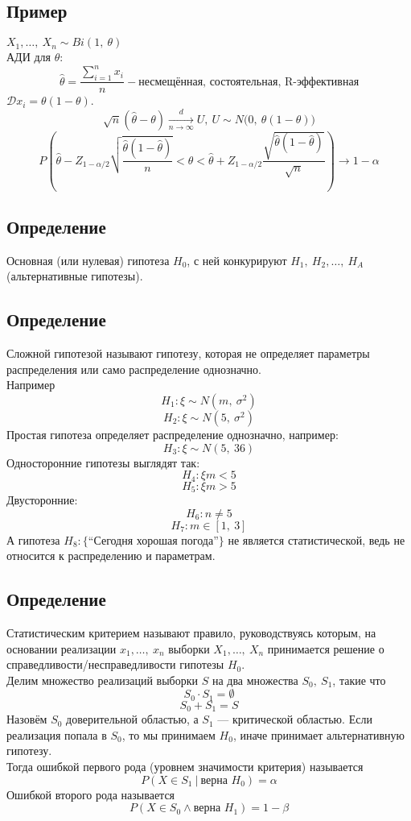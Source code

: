 \documentclass[12pt, a4paper]{article}
\newcommand{\dev}{\mathcal{D}}
\begin{document}
\subsection*{Пример}
$X_1,\dots,\ X_n \sim Bi(1,\ \theta)$\\
АДИ для $\theta$:
\[\hat\theta = \frac{\sum_{i = 1}^{n} x_i}{n} - \text{несмещённая, состоятельная, R-эффективная}\]
$\dev x_i = \theta(1 - \theta)$.
\[\sqrt{n} (\hat \theta - \theta) \xrightarrow[n\to \infty]{d} U,\ U\sim N\big(0,\ \theta(1 - \theta)\big)\]
\[P\left( \hat\theta - Z_{1 - \alpha/2} \sqrt{\frac{\hat\theta(1 - \hat\theta)}{n}} < \theta < \hat \theta + Z_{1 - \alpha/2} \frac{\sqrt{\hat{\theta}(1 - \hat \theta)}}{\sqrt{n}} \right) \to 1 - \alpha\]
\subsection*{Определение}
Основная (или нулевая) гипотеза $H_0$, с ней конкурируют $H_1,\ H_2,\dots,\ H_{A}$ (альтернативные гипотезы).
\subsection*{Определение}
Сложной гипотезой называют гипотезу, которая не определяет параметры распределения или само распределение однозначно.\\
Например
\[H_1: \xi \sim N(m,\ \sigma^2)\]
\[H_2: \xi \sim N(5,\ \sigma^2)\]
Простая гипотеза определяет распределение однозначно, например:
\[H_3: \xi \sim N(5,\ 36)\]
Односторонние гипотезы выглядят так:
\[H_4: \xi m < 5\]
\[H_5: \xi m > 5\]
Двусторонние:
\[H_6: n \neq 5\]
\[H_7: m\in [1,\ 3]\]
А гипотеза $H_8: \{\text{``Сегодня хорошая погода''}\}$ не является статистической, ведь не относится к распределению и параметрам.
\subsection*{Определение}
Статистическим критерием называют правило, руководствуясь которым, на основании реализации $x_1,\dots,\ x_n$ выборки $X_1,\dots,\ X_n$ принимается решение о справедливости/несправедливости гипотезы $H_0$.\\
Делим множество реализаций выборки $S$ на два множества $S_0,\ S_1$, такие что
\[S_0 \cdot S_1 = \emptyset\]
\[S_0 + S_1 = S\]
Назовём $S_0$ доверительной областью, а $S_1$ --- критической областью. Если реализация попала в $S_0$, то мы принимаем $H_0$, иначе принимает альтернативную гипотезу.\\
Тогда ошибкой первого рода (уровнем значимости критерия) называется
\[P(X\in S_1\ |\  \text{верна } H_0) = \alpha\]
Ошибкой второго рода называется 
\[P(X\in S_0 \wedge \text{верна } H_1) = 1 - \beta\]
\end{document}
